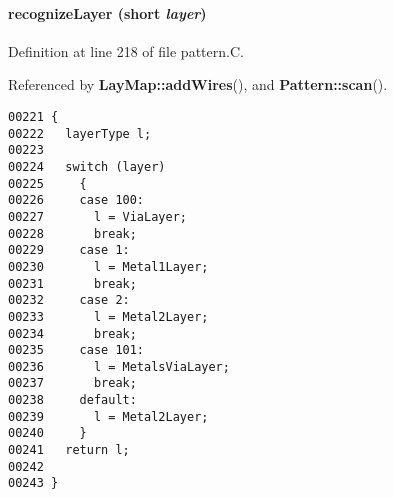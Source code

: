 \paragraph{ recognize\-Layer (short {\em layer})}\hfill



Definition at line 218 of file pattern.C.

Referenced by {\bf Lay\-Map::add\-Wires}(), and {\bf Pattern::scan}().\small\begin{verbatim}00221 {
00222   layerType l;
00223 
00224   switch (layer)
00225     {
00226     case 100:
00227       l = ViaLayer;
00228       break;
00229     case 1:
00230       l = Metal1Layer;  
00231       break;
00232     case 2:
00233       l = Metal2Layer;  
00234       break;
00235     case 101:
00236       l = MetalsViaLayer;  
00237       break;
00238     default:
00239       l = Metal2Layer;
00240     }
00241   return l;
00242 
00243 }
\end{verbatim}\normalsize 
